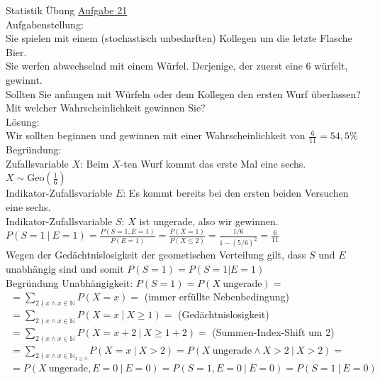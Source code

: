\documentclass[12pt]{article} %
\newcommand{\aufgabe}[1]{{\huge Statistik Übung \underline{Aufgabe #1}}\\[3.5ex]  }
\begin{document}
\aufgabe{21}
Aufgabenstellung: \\
Sie spielen mit einem (stochastisch unbedarften) Kollegen um die letzte Flasche Bier. \\
Sie werfen abwechselnd mit einem Würfel. Derjenige, der zuerst eine 6 würfelt, gewinnt. \\
Sollten Sie anfangen mit Würfeln oder dem Kollegen den ersten Wurf überlassen? \\
Mit welcher Wahrscheinlichkeit gewinnen Sie? \\[0.5cm]
Lösung: \\
Wir sollten beginnen und gewinnen mit einer Wahrscheinlichkeit von $\frac{6}{11} = 54,5\% $\\[0.5cm]
Begründung: \\
Zufallsvariable $X$: Beim $X$-ten Wurf kommt das erste Mal eine sechs. $X \sim \text{Geo}(\frac{1}{6})$\\
Indikator-Zufallsvariable $E$: Es kommt bereits bei den ersten beiden Versuchen eine sechs. \\
Indikator-Zufallsvariable $S$: $X$ ist ungerade, also wir gewinnen. \\
$P(S=1 ~ | ~ E=1) = \frac{P(S=1, E=1)}{P(E=1)} = \frac{P(X=1)}{P(X \leq 2)} = \frac{1/6}{1-(5/6)^2} = \frac{6}{11}$ \\
Wegen der Gedächtnislosigkeit der geometischen Verteilung gilt, dass $S$ und $E$ unabhängig sind und somit $P(S=1) = P(S=1 | E=1)$\\
Begründung Unabhängigkeit: $P(S=1) = P(X ~ \text{ungerade}) = $ \\ 
$ ~~ = \sum_{2 \nmid x \wedge x \in \mathbb{N}} P(X=x) = $ \hspace{3cm}\small{ (immer erfüllte Nebenbedingung)}\\
$ ~~ = \sum_{2 \nmid x \wedge x \in \mathbb{N}} P(X=x ~ | ~ X \geq 1) = $ \hspace{2cm}\small{ (Gedächtnislosigkeit)}\\
$ ~~ = \sum_{2 \nmid x \wedge x \in \mathbb{N}} P(X=x+2 ~ | ~ X \geq 1+2) = $ \hspace{1cm}\small{ (Summen-Index-Shift um 2)}\\
$ ~~ = \sum_{2 \nmid x \wedge x \in \mathbb{N}_{x\geq 3}} P(X=x ~ | ~ X > 2) = P(X ~ \text{ungerade} \wedge X > 2 ~ | ~ X > 2) = $\\
$ ~~ = P(X ~ \text{ungerade}, E = 0 ~ | ~ E = 0) = P(S=1, E=0 ~ | ~ E=0) = P(S=1 ~ | ~ E=0)$\\[1ex]
\- \dotfill
\\[4ex]
\end{document}
